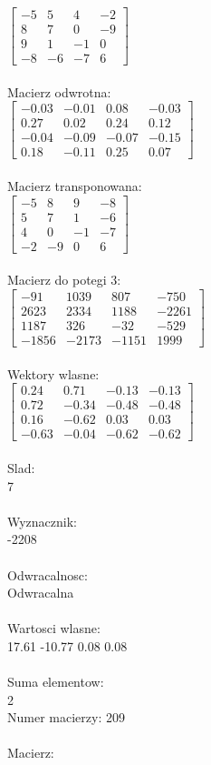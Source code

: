 \documentclass[a4paper,12pt]{article}
\begin{document}
$\begin{bmatrix} -5&5&4&-2\\8&7&0&-9\\9&1&-1&0\\-8&-6&-7&6 \end{bmatrix}$
\\
\\
Macierz odwrotna:\\

$\begin{bmatrix} -0.03&-0.01&0.08&-0.03\\0.27&0.02&0.24&0.12\\-0.04&-0.09&-0.07&-0.15\\0.18&-0.11&0.25&0.07 \end{bmatrix}$
\\
\\
Macierz transponowana:\\

$\begin{bmatrix} -5&8&9&-8\\5&7&1&-6\\4&0&-1&-7\\-2&-9&0&6 \end{bmatrix}$
\\
\\
Macierz do potegi 3:\\

$\begin{bmatrix} -91&1039&807&-750\\2623&2334&1188&-2261\\1187&326&-32&-529\\-1856&-2173&-1151&1999 \end{bmatrix}$
\\
\\
Wektory wlasne:\\

$\begin{bmatrix} 0.24&0.71&-0.13&-0.13\\0.72&-0.34&-0.48&-0.48\\0.16&-0.62&0.03&0.03\\-0.63&-0.04&-0.62&-0.62 \end{bmatrix}$
\\
\\
Slad:\\
7
\\
\\
Wyznacznik:\\
-2208
\\
\\
Odwracalnosc:\\
Odwracalna
\\
\\
Wartosci wlasne:\\
17.61 -10.77 0.08 0.08
\\
\\
Suma elementow:\\
2
\\
\newpage
Numer macierzy:
209
\\
\\
Macierz:\\
\end{document}
